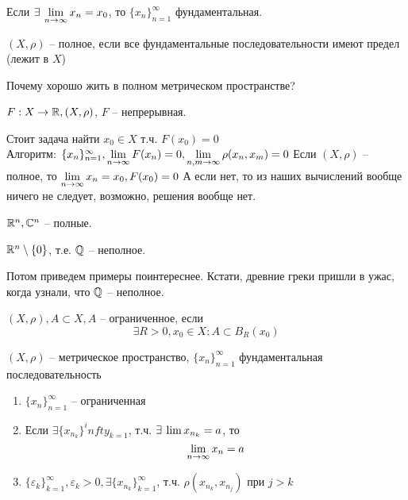 \documentclass[document]{subfiles}
\begin{document}
\begin{remark}
    Если $\exists \liml_{n \to \infty} x_n = x_0$, то $\{x_n\}^\infty_{n=1}$ фундаментальная.
\end{remark}


\begin{definition}
    $(X, \rho)$ -- полное, если все фундаментальные последовательности имеют предел (лежит в $X$)
\end{definition}

Почему хорошо жить в полном метрическом пространстве?

\begin{remark}
    $F: X \rightarrow \mathbb{R}, (X,\rho)$, $F$ -- непрерывная.

    Стоит задача найти $x_0 \in X$ т.ч. $F(x_0) = 0$ \\
    Алгоритм: $\{x_n\}^\infty_{n=1}, \lim\limits_{n \to \infty} F(x_n) = 0, \lim\limits_{n, m \to \infty} \rho(x_n, x_m) = 0$
    Если $(X, \rho)$ -- полное, то $\lim\limits_{n \to \infty} x_n = x_0, F(x_0) = 0$
    А если нет, то из наших вычислений вообще ничего не следует, возможно, решения вообще нет.
\end{remark}

\begin{example}
    $\mathbb{R}^n, \mathbb{C}^n$ -- полные.
\end{example}
    
\begin{example}
    $\mathbb{R}^n \setminus \{0\}$, т.е.  $\mathbb{Q}$ -- неполное.
\end{example}

Потом приведем примеры поинтереснее. Кстати, древние греки пришли в ужас, когда узнали, что $\mathbb{Q}$ -- неполное.

\begin{definition}
    $(X,\rho), A \subset X, A $ -- ограниченное, если 
    \[ \exists R > 0, x_0 \in X : A \subset B_R(x_0) \]
\end{definition}

\begin{theorem}
    $(X,\rho)$ -- метрическое пространство, $\{x_n\}^\infty_{n=1}$ фундаментальная последовательность
    \begin{enumerate}
        \item $\{x_n\}^\infty_{n=1}$ -- ограниченная
        \item Если $\exists \{x_{n_k}\}^infty_{k=1}$, т.ч. $\exists \liml x_{n_k} = a$, то
        \[ \lim\limits_{n \to \infty} x_n = a \] 
        \item $\{ \varepsilon_k \}_{k=1}^\infty, \varepsilon_k > 0, \exists \{x_{n_k}\}^\infty_{k=1}$, т.ч. $\rho(x_{n_k}, x_{n_j})$ при $j > k$
    \end{enumerate}
\end{theorem}
\end{document}
